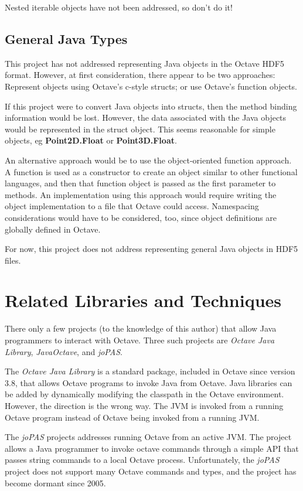 \documentclass{memoir}
\newcommand*{\bera}[1]{\textbf{\fontfamily{beramono}\selectfont\ttfamily #1}}
\newcommand*{\java}[1]{{\color[rgb]{.5,0,.5}\bera{#1}}}
\begin{document}
Nested iterable objects have not been addressed, so don't do it!

\section{General Java Types}

This project has not addressed representing Java objects in the Octave
HDF5 format.  However, at first consideration, there appear to be two
approaches: Represent objects using Octave's c-style structs; or use
Octave's function objects.

If this project were to convert Java objects into structs, then the
method binding information would be lost.  However, the data
associated with the Java objects would be represented in the struct
object.  This seems reasonable for simple objects, eg
\java{Point2D.Float} or \java{Point3D.Float}.

An alternative approach would be to use the object-oriented function
approach.  A function is used as a constructor to create an object
similar to other functional languages, and then that function object
is passed as the first parameter to methods. An implementation using
this approach would require writing the object implementation to a
file that Octave could access.  Namespacing considerations would have
to be considered, too, since object definitions are globally defined
in Octave.

For now, this project does not address representing general Java
objects in HDF5 files.



\chapter{Related Libraries and Techniques}

There only a few projects (to the knowledge of this author) that allow
Java programmers to interact with Octave.  Three such projects are
\textit{Octave Java Library}, \textit{JavaOctave}, and \textit{joPAS}.

The \textit{Octave Java Library} is a standard package, included in
Octave since version 3.8, that allows Octave programs to invoke Java
from Octave.  Java libraries can be added by dynamically modifying the
classpath in the Octave environment.  However, the direction is the
wrong way. The JVM is invoked from a running Octave program instead of
Octave being invoked from a running JVM.

The \textit{joPAS} projects addresses running Octave from an active
JVM.  The project allows a Java programmer to invoke octave commands
through a simple API that passes string commands to a local Octave
process.  Unfortunately, the \textit{joPAS} project does not
support many Octave commands and types, and the project has become
dormant since 2005.
\end{document}
